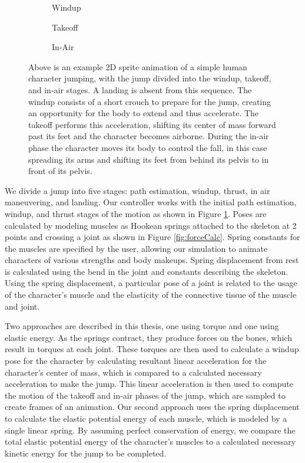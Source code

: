 \begin{figure}[htp]
	\centering
	\begin{subfigure}[h]{0.16\textwidth}
		\caption{Windup}
	\end{subfigure}
	\begin{subfigure}[h]{0.32\textwidth}
		\caption{Takeoff}
	\end{subfigure}
	\begin{subfigure}[h]{0.48\textwidth}
		\caption{In-Air}
	\end{subfigure}
	\caption[Example of stages of jumping]{Above is an example 2D sprite animation of a simple human character jumping, with the jump divided into the windup, takeoff, and in-air stages.  A landing is absent from this sequence.  The windup consists of a short crouch to prepare for the jump, creating an opportunity for the body to extend and thus accelerate.  The takeoff performs this acceleration, shifting its center of mass forward past its feet and the character becomes airborne.  During the in-air phase the character moves its body to control the fall, in this case spreading its arms and shifting its feet from behind its pelvis to in front of its pelvis.}
	\label{fig:jumpStages}
\end{figure}

We divide a jump into five stages: path estimation, windup, thrust, in air maneuvering, and landing. Our controller works with the initial path estimation, windup, and thrust stages of the motion as shown in Figure \ref{fig:jumpStages}.  Poses are  calculated by modeling muscles as Hookean springs attached to the skeleton at 2 points and crossing a joint as shown in Figure \ref{fig:forceCalc}. Spring constants for the muscles are specified by the user, allowing our simulation to animate characters of various strengths and body makeups.  Spring displacement from rest is calculated using the bend in the joint and constants describing the skeleton.  Using the spring displacement, a particular pose of a joint is related to the usage of the character's muscle and the elasticity of the connective tissue of the muscle and joint.

Two approaches are described in this thesis, one using torque and one using elastic energy.  As the springs contract, they produce forces on the bones, which result in torques at each joint.  These torques are then used to calculate a windup pose for the character by calculating resultant linear acceleration for the character's center of mass, which is compared to a calculated necessary acceleration to make the jump.  This linear acceleration is then used to compute the motion of the takeoff and in-air phases of the jump, which are sampled to create frames of an animation.  Our second approach uses the spring displacement to calculate the elastic potential energy of each muscle, which is modeled by a single linear spring.  By assuming perfect conservation of energy, we compare the total elastic potential energy of the character's muscles to a calculated necessary kinetic energy for the jump to be completed.


